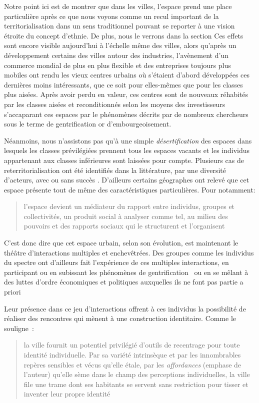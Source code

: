 Notre point ici est de montrer que dans les villes, l'espace prend une place particulière après ce que nous voyons comme un recul important de la territorialisation dans un sens traditionnel pouvant se reporter à une vision étroite du concept d'ethnie. 
De plus, nous le verrons dans la section  Ces effets sont encore visible aujourd'hui à l'échelle même des villes, alors qu'après un développement certains des villes autour des industries, l'avènement d'un commerce mondial de plus en plus flexible et des entreprises toujours plus mobiles ont rendu les vieux centres urbains où s'étaient d'abord développées ces dernières moins intéressants, que ce soit pour elles-mêmes que pour les classes plus aisées. 
Après avoir perdu en valeur, ces centres sont de nouveaux réhabités par les classes aisées et reconditionnés selon les moyens des investisseurs s'accaparant ces espaces par le phénomènes décrits par de nombreux chercheurs sous le terme de gentrification or d'embourgeoisement.

Néanmoins, nous n'assistons pas qu'à une simple \emph{désertification} des espaces dans lesquels les classes prévilégiées prennent tous les espaces vacants et les individus appartenant aux classes inférieures sont laissées pour compte.
Plusieurs cas de reterritorialisation ont été identifiés dans la littérature, par une diversité d'acteurs, avec ou sans succès \citet{Hatvany2005}. 
D'ailleurs certains géographes ont relevé que cet espace présente tout de même des caractéristiques particulières. 
Pour \citeauthor{Courville1991} notamment: \blockquote[{\cite[41]{Courville1991}}][.]{l'espace devient un médiateur du rapport entre individus, groupes et collectivités, un produit social à analyser comme tel, au milieu des pouvoirs et des rapports sociaux qui le structurent et l'organisent}.

C'est donc dire que cet espace urbain, selon son évolution, est maintenant le théâtre d'interactions multiples et enchevêtrées. 
Des groupes comme les individus du spectre \lgbt{} ont d'ailleurs fait l'expérience de ces multiples interactions, en participant ou en subissant les phénomènes de gentrification~\autocite{Podmore2001,Giraud2014,Hogan2005} ou en se mêlant à des luttes d'ordre économiques et politiques auxquelles ils ne font pas partie a priori~\autocite{Kelliher2014} 

Leur présence dans ce jeu d'interactions offrent à ces individus la possibilité de réaliser des rencontres qui mènent à une construction identitaire. 
Comme le souligne~\citeauthor{DiMeo2007}: \blockquote[{\cite[81]{DiMeo2007}}][.]{\textelp{} la ville fournit un potentiel privilégié d’outils de recentrage pour toute identité individuelle. Par sa variété intrinsèque et par les innombrables repères sensibles et vécus qu’elle étale, par les \emph{affordances} (emphase de l'auteur) qu’elle sème dans le champ des perceptions individuelles, la ville file une trame dont ses habitants se servent sans restriction pour tisser et inventer leur propre identité}.


